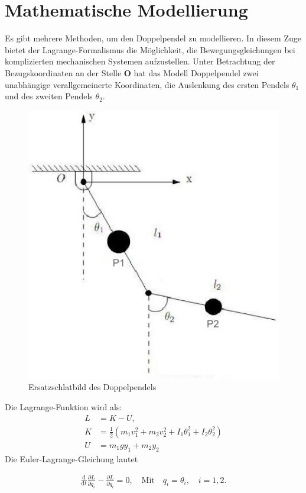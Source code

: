 \documentclass[shortdoc,ngerman,numberall]{article}
\begin{document}
{\selectfont
	
	\section*{ Mathematische Modellierung}
Es gibt mehrere Methoden, um den Doppelpendel zu modellieren. In diesem Zuge bietet der Lagrange-Formalismus die Möglichkeit, die Bewegungsgleichungen bei komplizierten mechanischen Systemen aufzustellen. Unter Betrachtung der Bezugskoordinaten an der Stelle $\boldsymbol{O}$ hat das Modell Doppelpendel zwei unabhängige verallgemeinerte Koordinaten, die Auslenkung des ersten Pendels $\theta_1$ und des zweiten Pendels $\theta_2$.\\


\begin{figure}[!h]
	\centering
	\includegraphics [scale=0.065]{Doppelpendel.pdf}
	\caption{Ersatzschlatbild des Doppelpendels}
	\label{Doppelpendel}
\end{figure}
Die Lagrange-Funktion wird als:\\
\begin{align*}
	L&= K-U,\\
	K&=\frac{1}{2} ( m_1 v_1^2 + m_2 v_2^2 + I_1 \theta_1^2+ I_2 \theta_2^2)\\
	U&= m_1 g y_1 + m_2 y_2
\end{align*}
Die Euler-Lagrange-Gleichung lautet

\begin{align*}
	\frac{\text{d}}{\text{d}t} \frac{\partial L}{\partial \dot{q_{i}}}- \frac{\partial L}{\partial q_{i} } = 0,  \quad  \text{Mit} \quad q_i = \theta_i , \quad i =1,2.
\end{align*}
}
\end{document}

